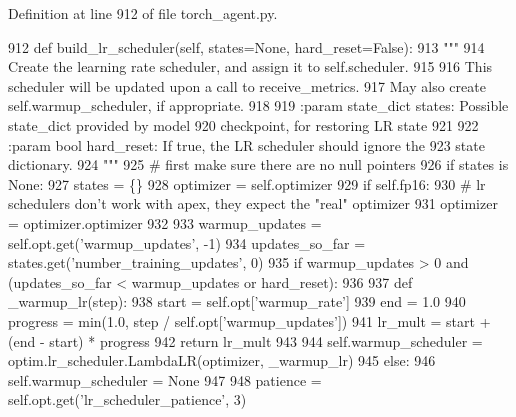 Definition at line 912 of file torch\+\_\+agent.\+py.


\begin{DoxyCode}
912     \textcolor{keyword}{def }build\_lr\_scheduler(self, states=None, hard\_reset=False):
913         \textcolor{stringliteral}{"""}
914 \textcolor{stringliteral}{        Create the learning rate scheduler, and assign it to self.scheduler.}
915 \textcolor{stringliteral}{}
916 \textcolor{stringliteral}{        This scheduler will be updated upon a call to receive\_metrics.}
917 \textcolor{stringliteral}{        May also create self.warmup\_scheduler, if appropriate.}
918 \textcolor{stringliteral}{}
919 \textcolor{stringliteral}{        :param state\_dict states: Possible state\_dict provided by model}
920 \textcolor{stringliteral}{            checkpoint, for restoring LR state}
921 \textcolor{stringliteral}{}
922 \textcolor{stringliteral}{        :param bool hard\_reset: If true, the LR scheduler should ignore the}
923 \textcolor{stringliteral}{            state dictionary.}
924 \textcolor{stringliteral}{        """}
925         \textcolor{comment}{# first make sure there are no null pointers}
926         \textcolor{keywordflow}{if} states \textcolor{keywordflow}{is} \textcolor{keywordtype}{None}:
927             states = \{\}
928         optimizer = self.optimizer
929         \textcolor{keywordflow}{if} self.fp16:
930             \textcolor{comment}{# lr schedulers don't work with apex, they expect the "real" optimizer}
931             optimizer = optimizer.optimizer
932 
933         warmup\_updates = self.opt.get(\textcolor{stringliteral}{'warmup\_updates'}, -1)
934         updates\_so\_far = states.get(\textcolor{stringliteral}{'number\_training\_updates'}, 0)
935         \textcolor{keywordflow}{if} warmup\_updates > 0 \textcolor{keywordflow}{and} (updates\_so\_far < warmup\_updates \textcolor{keywordflow}{or} hard\_reset):
936 
937             \textcolor{keyword}{def }\_warmup\_lr(step):
938                 start = self.opt[\textcolor{stringliteral}{'warmup\_rate'}]
939                 end = 1.0
940                 progress = min(1.0, step / self.opt[\textcolor{stringliteral}{'warmup\_updates'}])
941                 lr\_mult = start + (end - start) * progress
942                 \textcolor{keywordflow}{return} lr\_mult
943 
944             self.warmup\_scheduler = optim.lr\_scheduler.LambdaLR(optimizer, \_warmup\_lr)
945         \textcolor{keywordflow}{else}:
946             self.warmup\_scheduler = \textcolor{keywordtype}{None}
947 
948         patience = self.opt.get(\textcolor{stringliteral}{'lr\_scheduler\_patience'}, 3)

\end{DoxyCode}
